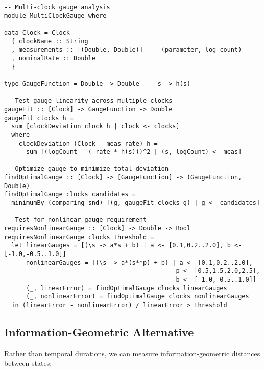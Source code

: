 \documentclass[11pt]{article}
\theoremstyle{definition}
\theoremstyle{plain}
\theoremstyle{remark}
\begin{document}
\begin{lstlisting}
-- Multi-clock gauge analysis
module MultiClockGauge where

data Clock = Clock 
  { clockName :: String
  , measurements :: [(Double, Double)]  -- (parameter, log_count)
  , nominalRate :: Double
  }

type GaugeFunction = Double -> Double  -- s -> h(s)

-- Test gauge linearity across multiple clocks
gaugeFit :: [Clock] -> GaugeFunction -> Double
gaugeFit clocks h = 
  sum [clockDeviation clock h | clock <- clocks]
  where
    clockDeviation (Clock _ meas rate) h =
      sum [(logCount - (-rate * h(s)))^2 | (s, logCount) <- meas]

-- Optimize gauge to minimize total deviation
findOptimalGauge :: [Clock] -> [GaugeFunction] -> (GaugeFunction, Double)
findOptimalGauge clocks candidates =
  minimumBy (comparing snd) [(g, gaugeFit clocks g) | g <- candidates]

-- Test for nonlinear gauge requirement
requiresNonlinearGauge :: [Clock] -> Double -> Bool  
requiresNonlinearGauge clocks threshold =
  let linearGauges = [(\s -> a*s + b) | a <- [0.1,0.2..2.0], b <- [-1.0,-0.5..1.0]]
      nonlinearGauges = [(\s -> a*(s**p) + b) | a <- [0.1,0.2..2.0], 
                                               p <- [0.5,1.5,2.0,2.5], 
                                               b <- [-1.0,-0.5..1.0]]
      (_, linearError) = findOptimalGauge clocks linearGauges
      (_, nonlinearError) = findOptimalGauge clocks nonlinearGauges
  in (linearError - nonlinearError) / linearError > threshold
\end{lstlisting}

\subsection{Information-Geometric Alternative}

Rather than temporal durations, we can measure information-geometric distances between states:
\end{document}
